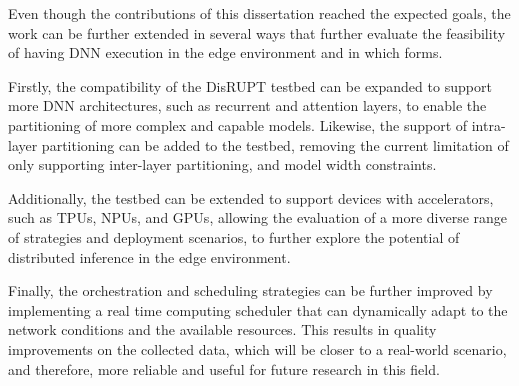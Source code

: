 Even though the contributions of this dissertation reached the expected goals, the work
can be further extended in several ways that further evaluate the feasibility of
having \ac{DNN} execution in the edge environment and in which forms. 

Firstly, the compatibility of the \ac{DisRUPT} testbed can be expanded to support
more \ac{DNN} architectures, such as recurrent and attention layers, to
enable the partitioning of more complex and capable models. Likewise, the
support of intra-layer partitioning can be added to the testbed, removing the
current limitation of only supporting inter-layer partitioning, and model width
constraints.

Additionally, the testbed can be extended to support devices with accelerators, such 
as \acp{TPU}, \acp{NPU}, and \acp{GPU}, allowing the evaluation of a more diverse 
range of strategies and deployment scenarios, to further explore the potential of
distributed inference in the edge environment. 

Finally, the orchestration and scheduling strategies can be further improved by
implementing a real time computing scheduler that can dynamically adapt to the
network conditions and the available resources. This results in quality improvements
on the collected data, which will be closer to a real-world scenario, and therefore, 
more reliable and useful for future research in this field.